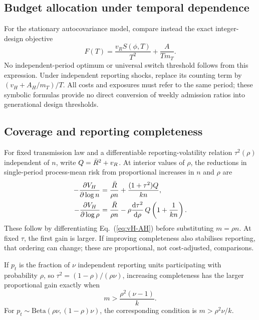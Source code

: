 \subsection{Budget allocation under temporal dependence}
\label{app:budget-ar}

For the stationary autocovariance model, compare instead the exact integer-design objective
\begin{equation}
 F(T)=\frac{v_RS(\phi,T)}{T^2}+\frac{A}{Tm_T}.
 \label{eq:budget-ar-exact}
\end{equation}
No independent-period optimum or universal switch threshold follows from this expression. Under independent reporting shocks, replace its counting term by $(v_H+A_H/m_T)/T$. All costs and exposures must refer to the same period; these symbolic formulas provide no direct conversion of weekly admission ratios into generational design thresholds.

\subsection{Coverage and reporting completeness}
\label{app:coverage}

For fixed transmission law and a differentiable reporting-volatility relation $\tau^2(\rho)$ independent of $n$, write $Q=\bar R^2+v_R$. At interior values of $\rho$, the reductions in single-period process-mean risk from proportional increases in $n$ and $\rho$ are
\begin{equation}
\begin{aligned}
 -\frac{\partial V_H}{\partial\log n}
 &=\frac{\bar R}{\rho n}+\frac{(1+\tau^2)Q}{kn},\\
 -\frac{\partial V_H}{\partial\log\rho}
 &=\frac{\bar R}{\rho n}-\rho\frac{\mathrm d\tau^2}{\mathrm d\rho}\,Q\left(1+\frac{1}{kn}\right).
\end{aligned}
 \label{eq:coverage-gains}
\end{equation}
These follow by differentiating Eq.~(\ref{eq:vH-AH}) before substituting $m=\rho n$. At fixed $\tau$, the first gain is larger. If improving completeness also stabilises reporting, that ordering can change; these are proportional, not cost-adjusted, comparisons.

\begin{corollary}
\label{cor:switch}
If $p_t$ is the fraction of $\nu$ independent reporting units participating with probability $\rho$, so $\tau^2=(1-\rho)/(\rho\nu)$, increasing completeness has the larger proportional gain exactly when
\begin{equation}
 m>\frac{\rho^2(\nu-1)}{k}.
 \label{eq:r3-switch}
\end{equation}
For $p_t\sim\mathrm{Beta}(\rho\nu,(1-\rho)\nu)$, the corresponding condition is $m>\rho^2\nu/k$.
\end{corollary}

